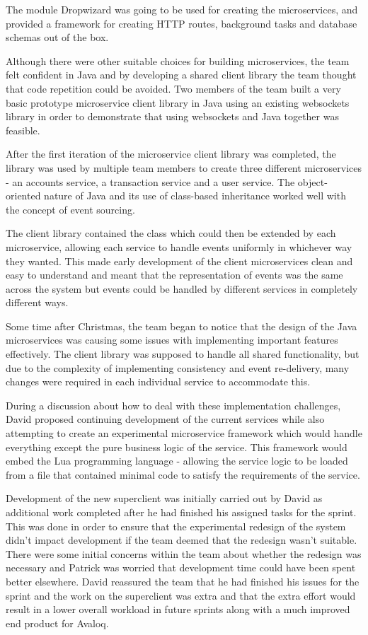 \documentclass{l3proj}
\begin{document}
The module Dropwizard \cite{dropwizard} was going to be used for creating the microservices, and provided a framework for creating HTTP routes, background tasks and database schemas out of the box.

Although there were other suitable choices for building microservices, the team felt confident in Java and by developing a shared client library the team thought that code repetition could be avoided. Two members of the team built a very basic prototype microservice client library in Java using an existing websockets library in order to demonstrate that using websockets and Java together was feasible.

After the first iteration of the microservice client library was completed, the library was used by multiple team members to create three different microservices - an accounts service, a transaction service and a user service. The object-oriented nature of Java and its use of class-based inheritance worked well with the concept of event sourcing.

The client library contained the  class which could then be extended by each microservice, allowing each service to handle events uniformly in whichever way they wanted. This made early development of the client microservices clean and easy to understand and meant that the representation of events was the same across the system but events could be handled by different services in completely different ways.

Some time after Christmas, the team began to notice that the design of the Java microservices was causing some issues with implementing important features effectively. The client library was supposed to handle all shared functionality, but due to the complexity of implementing consistency and event re-delivery, many changes were required in each individual service to accommodate this.

During a discussion about how to deal with these implementation challenges, David proposed continuing development of the current services while also attempting to create an experimental microservice framework which would handle everything except the pure business logic of the service. This framework would embed the Lua programming language - allowing the service logic to be loaded from a file that contained minimal code to satisfy the requirements of the service.

Development of the new superclient was initially carried out by David as additional work completed after he had finished his assigned tasks for the sprint. This was done in order to ensure that the experimental redesign of the system didn't impact development if the team deemed that the redesign wasn't suitable. There were some initial concerns within the team about whether the redesign was necessary and Patrick was worried that development time could have been spent better elsewhere. David reassured the team that he had finished his issues for the sprint and the work on the superclient was extra and that the extra effort would result in a lower overall workload in future sprints along with a much improved end product for Avaloq.
\end{document}
